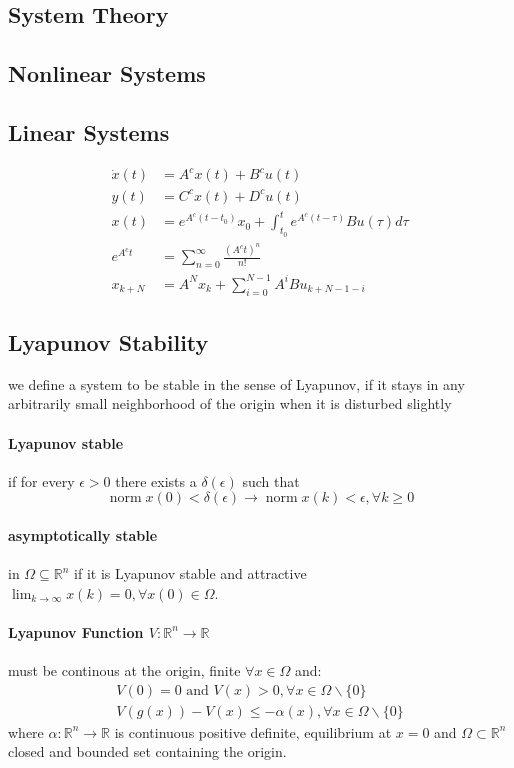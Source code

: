 \documentclass[landscape,a4paper,8pt]{scrartcl}
\newcommand{\R}{\mathbb R}
\DeclareMathOperator\norm{norm}
\begin{document}
\raggedright

\begin{multicols*}{3}
\section{System Theory}
\subsection{Nonlinear Systems}
\subsection{Linear Systems}
\begin{align*}
\dot{x}(t) &= A^cx(t)+B^cu(t)\\
y(t) &= C^cx(t) + D^cu(t)\\
x(t) &= e^{A^c(t-t_0)}x_0+\int_{t_0}^te^{A^c(t-\tau)}Bu(\tau)d\tau \\
e^{A^ct}&=\sum_{n=0}^\infty\frac{(A^ct)^n}{n!} \\
x_{k+N}&=A^Nx_k+\sum_{i=0}^{N-1}A^iBu_{k+N-1-i}
\end{align*}

\subsection{Lyapunov Stability}
we define a system to be stable in the sense of Lyapunov, if it stays in any arbitrarily small neighborhood of the origin when it is disturbed slightly
\paragraph{Lyapunov stable} if for every $\epsilon > 0$ there exists a $\delta(\epsilon)$ such that
\[ \norm{x(0)}<\delta(\epsilon)\to \norm{x(k)} < \epsilon, \forall k \geq 0 \]
\paragraph{asymptotically stable} in $\Omega\subseteq \R^n$ if it is Lyapunov stable and attractive $\lim_{k\to\infty}x(k)=0, \forall x(0)\in \Omega$.

\paragraph{Lyapunov Function $V: \R^n \to \R$}
must be continous at the origin, finite $\forall x \in \Omega$ and:
\begin{align*}
V(0) = 0 \text{ and } V(x)>0, \forall x\in \Omega \backslash \{0\}\\
V(g(x))-V(x) \leq -\alpha(x), \forall x\in\Omega\backslash \{0\}
\end{align*}
where $\alpha: \R^n\to\R$ is continuous positive definite, equilibrium at $x=0$
and $\Omega\subset\R^n$ closed and bounded set containing the origin.


\end{multicols*}
\end{document}
